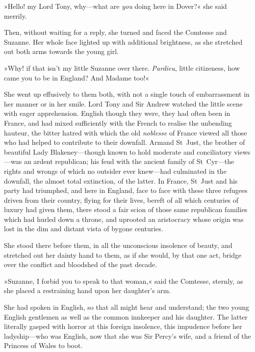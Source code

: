 »Hello! my Lord Tony, why\allowbreak---\allowbreak what are \textit{you} doing here in Dover?« she said merrily.

Then, without waiting for a reply, she turned and faced the Comtesse and Suzanne. Her whole face lighted up with additional brightness, as she stretched out both arms towards the young girl.

»Why! if that isn't my little Suzanne over there. \textit{Pardieu}, little citizeness, how came you to be in England? And Madame too!«

She went up effusively to them both, with not a single touch of embarrassment in her manner or in her smile. Lord Tony and Sir Andrew watched the little scene with eager apprehension. English though they were, they had often been in France, and had mixed sufficiently with the French to realise the unbending hauteur, the bitter hatred with which the old \textit{noblesse} of France viewed all those who had helped to contribute to their downfall. Armand St~Just, the brother of beautiful Lady Blakeney\allowbreak---\allowbreak though known to hold moderate and conciliatory views\allowbreak---\allowbreak was an ardent republican; his feud with the ancient family of St~Cyr\allowbreak---\allowbreak the rights and wrongs of which no outsider ever knew\allowbreak---\allowbreak had culminated in the downfall, the almost total extinction, of the latter. In France, St~Just and his party had triumphed, and here in England, face to face with these three refugees driven from their country, flying for their lives, bereft of all which centuries of luxury had given them, there stood a fair scion of those same republican families which had hurled down a throne, and uprooted an aristocracy whose origin was lost in the dim and distant vista of bygone centuries.

She stood there before them, in all the unconscious insolence of beauty, and stretched out her dainty hand to them, as if she would, by that one act, bridge over the conflict and bloodshed of the past decade.

»Suzanne, I forbid you to speak to that woman,« said the Comtesse, sternly, as she placed a restraining hand upon her daughter's arm.

She had spoken in English, so that all might hear and understand; the two young English gentlemen as well as the common innkeeper and his daughter. The latter literally gasped with horror at this foreign insolence, this impudence before her ladyship\allowbreak---\allowbreak who was English, now that she was Sir Percy's wife, and a friend of the Princess of Wales to boot.

